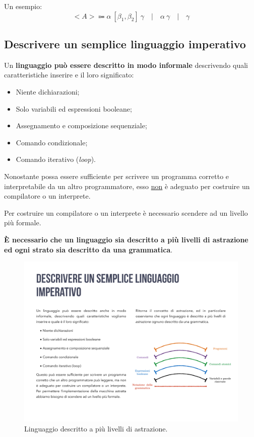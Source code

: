 \documentclass[a4paper]{article}
\begin{document}
	Un esempio:
	\begin{equation*}
		<A> \Coloneqq \alpha \: \left[\beta_{1}, \beta_{2}\right] \: \gamma \hspace{1em} | \hspace{1em} \alpha \: \gamma \hspace{1em} | \hspace{1em} \gamma
	\end{equation*}\newpage

	\subsection{Descrivere un semplice linguaggio imperativo}

	Un \textbf{linguaggio può essere descritto in modo informale} descrivendo quali caratteristiche inserire e il loro significato:
	\begin{itemize}
		\item Niente dichiarazioni;
		\item Solo variabili ed espressioni booleane;
		\item Assegnamento e composizione sequenziale;
		\item Comando condizionale;
		\item Comando iterativo (\emph{loop}).
	\end{itemize}
	Nonostante possa essere sufficiente per scrivere un programma corretto e interpretabile da un altro programmatore, esso \underline{non} è adeguato per costruire un compilatore o un interprete.\newline
	
	\noindent
	Per costruire un compilatore o un interprete è necessario scendere ad un livello più formale.\newline

	\noindent
	\textbf{È necessario che un linguaggio sia descritto a più livelli di astrazione ed ogni strato sia descritto da una grammatica}.

	\begin{figure}[!htp]
		\centering
		\includegraphics[width=\textwidth]{img/astrazione_linguaggi.pdf}
		\caption{Linguaggio descritto a più livelli di astrazione.}
	\end{figure}
\end{document}
